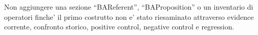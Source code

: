 \documentclass[11pt,a4paper]{article}
\begin{document}
\begin{ddtacheck}[title={Stop condition della R1 Rebuild R1}]
Non aggiungere una sezione ``BAReferent'', ``BAProposition'' o un inventario di operatori finche' il primo costrutto non e' stato riesaminato attraverso evidence corrente, confronto storico, positive control, negative control e regression.
\end{ddtacheck}
\end{document}
